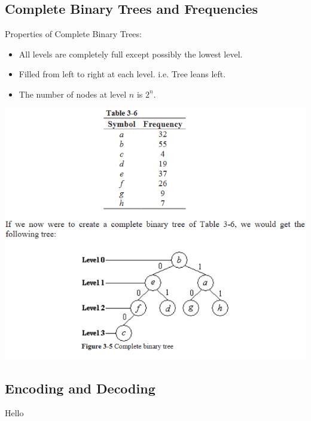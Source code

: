 \documentclass{beamer}
\begin{document}
\subsection{Complete Binary Trees and Frequencies}
\begin{frame}
Properties of Complete Binary Trees:
\begin{itemize}
\item All levels are completely full except possibly the lowest level.
\item Filled from left to right at each level. i.e. Tree leans left.
\item The number of nodes at level $n$ is $2^n$.
\end{itemize}
\end{frame}

\begin{frame}
\begin{center}
\includegraphics[scale=0.55]{example}
\end{center}
\end{frame}

\subsection{Encoding and Decoding}
\begin{frame}
Hello
\end{frame}
\end{document}
